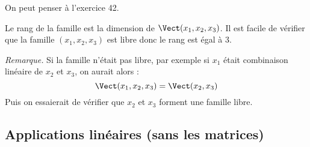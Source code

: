 \documentclass[a4paper,twoside,french,11pt]{VcCours}
\begin{document}
\begin{Exercice}{}\end{Exercice}On peut penser à l'exercice 42.



\begin{Exercice}{}\end{Exercice}Le rang de la famille est la dimension de $\Vect(x_1,x_2,x_3)$. Il est facile de vérifier que la famille $(x_1,x_2,x_3)$ est libre donc le rang est égal à $3$.



\noindent \textit{Remarque.} Si la famille n'était pas libre, par exemple si $x_1$ était combinaison linéaire de $x_2$ et $x_3$, on aurait alors :
$$ \Vect(x_1,x_2,x_3) =\Vect(x_2,x_3)$$
Puis on essaierait de vérifier que $x_2$ et $x_3$ forment une famille libre.

\subsection{Applications linéaires (sans les matrices)}
\end{document}
